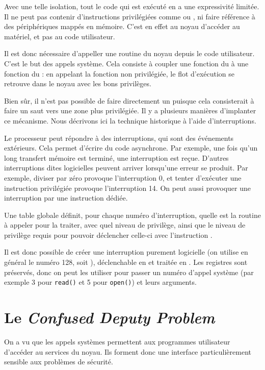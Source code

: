 Avec une telle isolation, tout le code qui est exécuté en  a une
expressivité limitée. Il ne peut pas contenir d'instructions privilégiées comme
 ou , ni faire référence à des périphériques mappés
en mémoire. C'est en effet au noyau d'accéder au matériel, et pas au code
utilisateur.

Il est donc nécessaire d'appeller une routine du noyau depuis le code
utilisateur. C'est le but des appels système. Cela consiste à coupler une
fonction du  à une fonction du : en appelant la fonction non
privilégiée, le flot d'exécution se retrouve dans le noyau avec les bons
privilèges.

Bien sûr, il n'est pas possible de faire directement un  puisque
cela consisterait à faire un saut vers une zone plus privilégiée. Il y a
plusieurs manières d'implanter ce mécanisme. Nous décrivons ici la technique
historique à l'aide d'interruptions.

Le processeur peut répondre à des interruptions, qui sont des événements
extérieurs. Cela permet d'écrire du code asynchrone. Par exemple, une fois qu'un
long transfert mémoire est terminé, une interruption est reçue. D'autres
interruptions dites logicielles peuvent arriver lorsqu'une erreur se produit.
Par exemple, diviser par zéro provoque l'interruption 0, et tenter d'exécuter
une instruction privilégiée provoque l'interruption 14. On peut aussi provoquer
une interruption par une instruction  dédiée.

Une table globale définit, pour chaque numéro d'interruption, quelle est la
routine à appeler pour la traiter, avec quel niveau de privilège, ainsi que le
niveau de privilège requis pour pouvoir déclencher celle-ci avec l'instruction
.

Il est donc possible de créer une interruption purement logicielle (on utilise
en général le numéro 128, soit ), déclenchable en  et traitée
en . Les registres sont préservés, donc on peut les utiliser pour passer
un numéro d'appel système (par exemple 3 pour \texttt{read()} et 5 pour
\texttt{open()}) et leurs arguments.

\section{Le \emph{Confused Deputy Problem}}
\label{sec:secu-syscalls}

On a vu que les appels systèmes permettent aux programmes utilisateur d'accéder
au services du noyau. Ils forment donc une interface particulièrement sensible aux
problèmes de sécurité.

